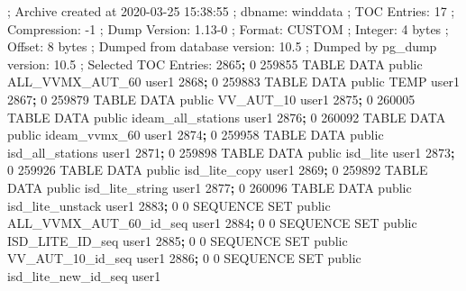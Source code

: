 \documentclass[12pt,oneside]{reedthesis}
\newenvironment{Shaded}{\begin{snugshade}}{\end{snugshade}}
\newcommand{\ExtensionTok}[1]{#1}
\newcommand{\KeywordTok}[1]{\textcolor[rgb]{0.13,0.29,0.53}{\textbf{#1}}}
\newcommand{\NormalTok}[1]{#1}
\begin{document}
\vspace{0.4cm}
\begin{Shaded}
\begin{Highlighting}[]
\NormalTok{      ; }\ExtensionTok{Archive}\NormalTok{ created at 2020-03-25 15:38:55}
\NormalTok{      ;     }\ExtensionTok{dbname}\NormalTok{: winddata}
\NormalTok{      ;     }\ExtensionTok{TOC}\NormalTok{ Entries: 17}
\NormalTok{      ;     }\ExtensionTok{Compression}\NormalTok{: -1}
\NormalTok{      ;     }\ExtensionTok{Dump}\NormalTok{ Version: 1.13-0}
\NormalTok{      ;     }\ExtensionTok{Format}\NormalTok{: CUSTOM}
\NormalTok{      ;     }\ExtensionTok{Integer}\NormalTok{: 4 bytes}
\NormalTok{      ;     }\ExtensionTok{Offset}\NormalTok{: 8 bytes}
\NormalTok{      ;     }\ExtensionTok{Dumped}\NormalTok{ from database version: 10.5}
\NormalTok{      ;     }\ExtensionTok{Dumped}\NormalTok{ by pg_dump version: 10.5}
\NormalTok{      ; }\ExtensionTok{Selected}\NormalTok{ TOC Entries:}
      \ExtensionTok{2865}\KeywordTok{;} \ExtensionTok{0}\NormalTok{ 259855 TABLE DATA public ALL_VVMX_AUT_60 user1}
      \ExtensionTok{2868}\KeywordTok{;} \ExtensionTok{0}\NormalTok{ 259883 TABLE DATA public TEMP user1}
      \ExtensionTok{2867}\KeywordTok{;} \ExtensionTok{0}\NormalTok{ 259879 TABLE DATA public VV_AUT_10 user1}
      \ExtensionTok{2875}\KeywordTok{;} \ExtensionTok{0}\NormalTok{ 260005 TABLE DATA public ideam_all_stations user1}
      \ExtensionTok{2876}\KeywordTok{;} \ExtensionTok{0}\NormalTok{ 260092 TABLE DATA public ideam_vvmx_60 user1}
      \ExtensionTok{2874}\KeywordTok{;} \ExtensionTok{0}\NormalTok{ 259958 TABLE DATA public isd_all_stations user1}
      \ExtensionTok{2871}\KeywordTok{;} \ExtensionTok{0}\NormalTok{ 259898 TABLE DATA public isd_lite user1}
      \ExtensionTok{2873}\KeywordTok{;} \ExtensionTok{0}\NormalTok{ 259926 TABLE DATA public isd_lite_copy user1}
      \ExtensionTok{2869}\KeywordTok{;} \ExtensionTok{0}\NormalTok{ 259892 TABLE DATA public isd_lite_string user1}
      \ExtensionTok{2877}\KeywordTok{;} \ExtensionTok{0}\NormalTok{ 260096 TABLE DATA public isd_lite_unstack user1}
      \ExtensionTok{2883}\KeywordTok{;} \ExtensionTok{0}\NormalTok{ 0 SEQUENCE SET public ALL_VVMX_AUT_60_id_seq user1}
      \ExtensionTok{2884}\KeywordTok{;} \ExtensionTok{0}\NormalTok{ 0 SEQUENCE SET public ISD_LITE_ID_seq user1}
      \ExtensionTok{2885}\KeywordTok{;} \ExtensionTok{0}\NormalTok{ 0 SEQUENCE SET public VV_AUT_10_id_seq user1}
      \ExtensionTok{2886}\KeywordTok{;} \ExtensionTok{0}\NormalTok{ 0 SEQUENCE SET public isd_lite_new_id_seq user1}
\end{Highlighting}
\end{Shaded}
\normalsize
\end{document}

